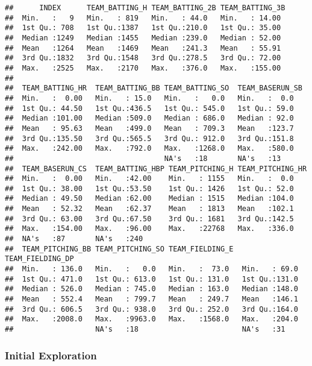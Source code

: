 \documentclass[
]{article}
\begin{document}
\begin{verbatim}
##      INDEX      TEAM_BATTING_H TEAM_BATTING_2B TEAM_BATTING_3B 
##  Min.   :   9   Min.   : 819   Min.   : 44.0   Min.   : 14.00  
##  1st Qu.: 708   1st Qu.:1387   1st Qu.:210.0   1st Qu.: 35.00  
##  Median :1249   Median :1455   Median :239.0   Median : 52.00  
##  Mean   :1264   Mean   :1469   Mean   :241.3   Mean   : 55.91  
##  3rd Qu.:1832   3rd Qu.:1548   3rd Qu.:278.5   3rd Qu.: 72.00  
##  Max.   :2525   Max.   :2170   Max.   :376.0   Max.   :155.00  
##                                                                
##  TEAM_BATTING_HR  TEAM_BATTING_BB TEAM_BATTING_SO  TEAM_BASERUN_SB
##  Min.   :  0.00   Min.   : 15.0   Min.   :   0.0   Min.   :  0.0  
##  1st Qu.: 44.50   1st Qu.:436.5   1st Qu.: 545.0   1st Qu.: 59.0  
##  Median :101.00   Median :509.0   Median : 686.0   Median : 92.0  
##  Mean   : 95.63   Mean   :499.0   Mean   : 709.3   Mean   :123.7  
##  3rd Qu.:135.50   3rd Qu.:565.5   3rd Qu.: 912.0   3rd Qu.:151.8  
##  Max.   :242.00   Max.   :792.0   Max.   :1268.0   Max.   :580.0  
##                                   NA's   :18       NA's   :13     
##  TEAM_BASERUN_CS  TEAM_BATTING_HBP TEAM_PITCHING_H TEAM_PITCHING_HR
##  Min.   :  0.00   Min.   :42.00    Min.   : 1155   Min.   :  0.0   
##  1st Qu.: 38.00   1st Qu.:53.50    1st Qu.: 1426   1st Qu.: 52.0   
##  Median : 49.50   Median :62.00    Median : 1515   Median :104.0   
##  Mean   : 52.32   Mean   :62.37    Mean   : 1813   Mean   :102.1   
##  3rd Qu.: 63.00   3rd Qu.:67.50    3rd Qu.: 1681   3rd Qu.:142.5   
##  Max.   :154.00   Max.   :96.00    Max.   :22768   Max.   :336.0   
##  NA's   :87       NA's   :240                                      
##  TEAM_PITCHING_BB TEAM_PITCHING_SO TEAM_FIELDING_E  TEAM_FIELDING_DP
##  Min.   : 136.0   Min.   :   0.0   Min.   :  73.0   Min.   : 69.0   
##  1st Qu.: 471.0   1st Qu.: 613.0   1st Qu.: 131.0   1st Qu.:131.0   
##  Median : 526.0   Median : 745.0   Median : 163.0   Median :148.0   
##  Mean   : 552.4   Mean   : 799.7   Mean   : 249.7   Mean   :146.1   
##  3rd Qu.: 606.5   3rd Qu.: 938.0   3rd Qu.: 252.0   3rd Qu.:164.0   
##  Max.   :2008.0   Max.   :9963.0   Max.   :1568.0   Max.   :204.0   
##                   NA's   :18                        NA's   :31
\end{verbatim}

\hypertarget{initial-exploration}{%
\subsubsection{Initial Exploration}\label{initial-exploration}}
\end{document}
